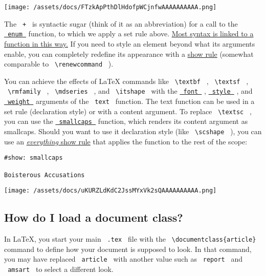 \texttt{[image: /assets/docs/FTzkApPthDlHdofpWCjnfwAAAAAAAAAA.png]}

The \texttt{\ +\ } is syntactic sugar (think of it as an abbreviation)
for a call to the \href{/docs/reference/model/enum/}{\texttt{\ enum\ }}
function, to which we apply a set rule above.
\href{/docs/reference/syntax/}{Most syntax is linked to a function in
this way.} If you need to style an element beyond what its arguments
enable, you can completely redefine its appearance with a
\href{/docs/reference/styling/\#show-rules}{show rule} (somewhat
comparable to \texttt{\ \textbackslash{}renewcommand\ } ).

You can achieve the effects of LaTeX commands like
\texttt{\ \textbackslash{}textbf\ } ,
\texttt{\ \textbackslash{}textsf\ } ,
\texttt{\ \textbackslash{}rmfamily\ } ,
\texttt{\ \textbackslash{}mdseries\ } , and
\texttt{\ \textbackslash{}itshape\ } with the
\href{/docs/reference/text/text/\#parameters-font}{\texttt{\ font\ }} ,
\href{/docs/reference/text/text/\#parameters-style}{\texttt{\ style\ }}
, and
\href{/docs/reference/text/text/\#parameters-weight}{\texttt{\ weight\ }}
arguments of the \texttt{\ text\ } function. The text function can be
used in a set rule (declaration style) or with a content argument. To
replace \texttt{\ \textbackslash{}textsc\ } , you can use the
\href{/docs/reference/text/smallcaps/}{\texttt{\ smallcaps\ }} function,
which renders its content argument as smallcaps. Should you want to use
it declaration style (like \texttt{\ \textbackslash{}scshape\ } ), you
can use an \href{/docs/reference/styling/\#show-rules}{\emph{everything}
show rule} that applies the function to the rest of the scope:

\begin{verbatim}
#show: smallcaps

Boisterous Accusations
\end{verbatim}

\texttt{[image: /assets/docs/uKURZLdKdC2JssMYxVk2sQAAAAAAAAAA.png]}

\subsection{How do I load a document class?}\label{templates}

In LaTeX, you start your main \texttt{\ .tex\ } file with the
\texttt{\ \textbackslash{}documentclass\{article\}\ } command to define
how your document is supposed to look. In that command, you may have
replaced \texttt{\ article\ } with another value such as
\texttt{\ report\ } and \texttt{\ amsart\ } to select a different look.

